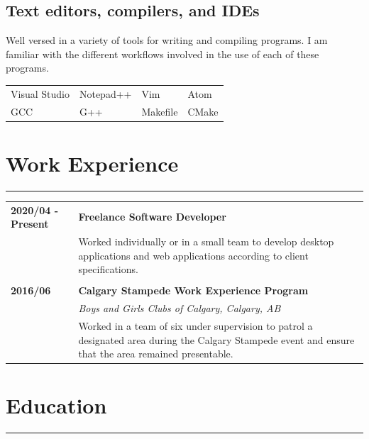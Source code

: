 \documentclass[letterpaper]{article}
\newcommand{\horizontalLine}{%
    \rule{\textwidth}{0.2pt}
    \vspace{1ex}
}
\begin{document}
        \subsection*{Text editors, compilers, and IDEs}
        Well versed in a variety of tools for writing and compiling programs.
        I am familiar with the different workflows involved in the use of each of these programs.

        \begin{center}
        \begin{tabular}{p{} p{} p{} p{}}
            Visual Studio & Notepad++ & Vim & Atom \\
            GCC & G++ & Makefile & CMake \\
        \end{tabular}
        \end{center}

    \section*{Work Experience}

        \horizontalLine

        \begin{tabular}{p{} p{}} 
            \textbf{2020/04 - Present} & \large\textbf{Freelance Software Developer} \\
            & Worked individually or in a small team to develop desktop applications and web applications according to client specifications. \\
            \\
            \textbf{2016/06} & \large\textbf{Calgary Stampede Work Experience Program} \\
            & \emph{Boys and Girls Clubs of Calgary, Calgary, AB} \\
            & Worked in a team of six under supervision to patrol a designated area during the Calgary Stampede event and ensure that the area remained presentable. \\
        \end{tabular}

    \section*{Education}

        \horizontalLine
\end{document}
